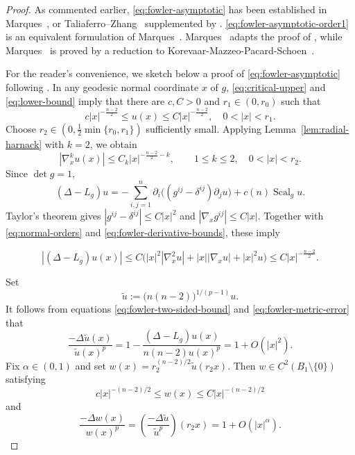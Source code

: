 \documentclass[11pt]{article}
\numberwithin{equation}{section}
\theoremstyle{remark}
\begin{document}
\par
\begin{proof}
As commented earlier, \eqref{eq:fowler-asymptotic} has been established in Marques~\cite[Theorem 8]{f-mar}, or Taliaferro--Zhang~\cite[Theorem 1]{TZ} supplemented by \mbox{\cite[Theorem  3]{HanLiTeixeira}}. \eqref{eq:fowler-asymptotic-order1} is an equivalent formulation of 
 Marques~\cite[Theorem 10]{f-mar}.
Marques~\cite[Theorem 8]{f-mar} adapts the proof of \cite[Proposition 5]{KMPS}, while
Marques~\cite[Theorem 10]{f-mar} is proved by a reduction to Korevaar-Mazzeo-Pacard-Schoen~\cite[Corollary 1]{KMPS}. 

For the reader's convenience, we sketch below a proof of \eqref{eq:fowler-asymptotic} following \cite{TZ}. In any geodesic normal coordinate $x$ of $g$, 
\eqref{eq:critical-upper} and \eqref{eq:lower-bound} imply that there are
\(c,C>0\) and \(r_1\in(0,r_0)\) such that
\begin{equation}\label{eq:fowler-two-sided-bound}
 c|x|^{-\frac{n-2}{2}}\le u(x)\le C|x|^{-\frac{n-2}{2}},
 \quad 0<|x|<r_1.
\end{equation}
Choose \(r_2\in(0,\frac12\min\{r_0,r_1\})\) sufficiently small. Applying Lemma~\ref{lem:radial-harnack} with \(k=2\), we obtain
\begin{equation}\label{eq:fowler-derivative-bounds}
 |\nabla_x^ku(x)|\le C_k|x|^{-\frac{n-2}{2}-k},
 \qquad 1\le k\le2,\quad 0<|x|<r_2.
\end{equation}
Since \(\det g=1\),
\[
 (\Delta-L_g)u
 =-\sum_{i,j=1}^n\partial_i
 \bigl((g^{ij}-\delta^{ij})\partial_ju\bigr)+c(n)\operatorname{Scal}_gu.
\]
Taylor's theorem gives
\(|g^{ij}-\delta^{ij}|\le C|x|^2\) and
\(|\nabla_xg^{ij}|\le C|x|\). Together with
\eqref{eq:normal-orders} and \eqref{eq:fowler-derivative-bounds}, these imply
 
\begin{equation}\label{eq:fowler-metric-error}
 |(\Delta-L_g)u(x)|
 \le C\bigl(|x|^2|\nabla_x^2u|
             +|x||\nabla_xu|+|x|^2u\bigr)
 \le C|x|^{-\frac{n-2}{2}}.
\end{equation}

Set 
\[
 \widetilde u
 :=\bigl(n(n-2)\bigr)^{1/(p-1)}u.
\]
It follows from equations  \eqref{eq:fowler-two-sided-bound} and
\eqref{eq:fowler-metric-error} that
\begin{equation}\label{eq:normalized-euclidean-ratio}
 \frac{-\Delta\widetilde u(x)}{\widetilde u(x)^p}
 =1-\frac{(\Delta-L_g)u(x)}{n(n-2)u(x)^p}
 =1+O(|x|^2).
\end{equation}
Fix \(\alpha\in(0,1)\) and set
\(w(x)=r_2^{(n-2)/2}\widetilde u(r_2 x)\). Then \(w\in C^2(B_1\setminus\{0\})\) satisfying
\[c|x|^{-(n-2)/2}\le w(x)\le C|x|^{-(n-2)/2}\]
and 
\[
\frac{-\Delta w(x)}{w(x)^p}
 =\left(\frac{-\Delta\widetilde u}{\widetilde u^p}\right)(r_2x)
 =1+O(|x|^\alpha).
\]


\end{proof}
\end{document}
